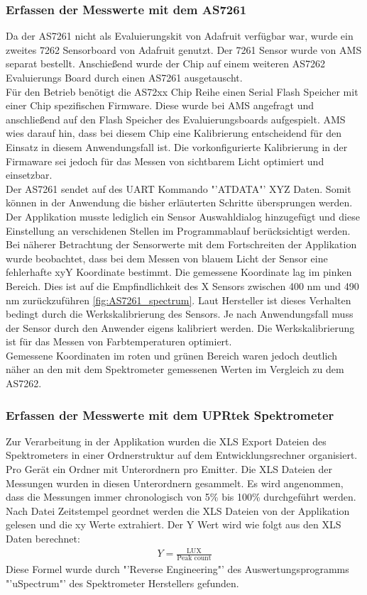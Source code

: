\documentclass[11pt]{scrartcl}
\begin{document}
\subsubsection{Erfassen der Messwerte mit dem AS7261} \label{measuringWith7261}
Da der AS7261 nicht als Evaluierungskit von Adafruit verfügbar war, wurde ein zweites 7262 Sensorboard von Adafruit genutzt. Der 7261 Sensor
wurde von AMS separat bestellt. Anschießend wurde der Chip auf einem weiteren AS7262 Evaluierungs Board durch einen AS7261 ausgetauscht.\\
Für den Betrieb benötigt die AS72xx Chip Reihe einen Serial Flash Speicher mit einer Chip spezifischen Firmware. Diese wurde bei AMS angefragt
und anschließend auf den Flash Speicher des Evaluierungsboards aufgespielt. AMS wies darauf hin, dass bei diesem Chip eine Kalibrierung entscheidend
für den Einsatz in diesem Anwendungsfall ist. Die vorkonfigurierte Kalibrierung in der Firmaware sei jedoch für das Messen von sichtbarem Licht
optimiert und einsetzbar.\\
Der AS7261 sendet auf des UART Kommando "'ATDATA"' XYZ Daten. Somit können in der Anwendung die bisher erläuterten Schritte übersprungen werden.
Der Applikation musste lediglich ein Sensor Auswahldialog hinzugefügt und diese Einstellung an verschidenen Stellen im Programmablauf
berücksichtigt werden.\\
Bei näherer Betrachtung der Sensorwerte mit dem Fortschreiten der Applikation wurde beobachtet, dass bei dem Messen von blauem Licht der Sensor
eine fehlerhafte xyY Koordinate bestimmt. Die gemessene Koordinate lag im pinken Bereich. Dies ist auf die Empfindlichkeit des X Sensors zwischen
400 nm und 490 nm zurückzuführen \ref{fig:AS7261_spectrum}. Laut Hersteller ist dieses Verhalten bedingt durch die Werkskalibrierung des Sensors.
Je nach Anwendungsfall muss der Sensor durch den Anwender eigens kalibriert werden. Die Werkskalibrierung ist für das Messen von Farbtemperaturen
optimiert.\\
Gemessene Koordinaten im roten und grünen Bereich waren jedoch deutlich näher an den mit dem Spektrometer gemessenen Werten im Vergleich zu
dem AS7262.
\subsubsection{Erfassen der Messwerte mit dem UPRtek Spektrometer}
Zur Verarbeitung in der Applikation wurden die XLS Export Dateien des Spektrometers in einer Ordnerstruktur auf dem Entwicklungsrechner organisiert.
Pro Gerät ein Ordner mit Unterordnern pro Emitter. Die XLS Dateien der Messungen wurden in diesen Unterordnern gesammelt. Es wird angenommen, dass die
Messungen immer chronologisch von 5\% bis 100\% durchgeführt werden. Nach Datei Zeitstempel geordnet werden die XLS Dateien von der Applikation gelesen
und die xy Werte extrahiert. Der Y Wert wird wie folgt aus den XLS Daten berechnet:
\begin{align}\label{Equ:23}
    Y = \frac{\text{LUX}}{\text{Peak count}}
\end{align}
Diese Formel wurde durch "'Reverse Engineering"' des Auswertungsprogramms "'uSpectrum"' des Spektrometer Herstellers gefunden.
\end{document}
